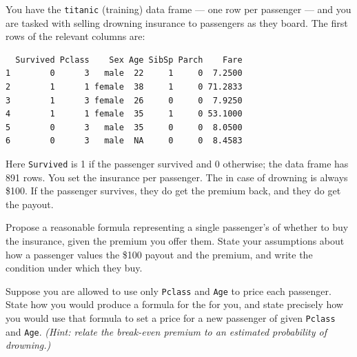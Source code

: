 \question{}

You have the \verb|titanic| (training) data frame --- one row per passenger --- and you are tasked with selling drowning insurance to passengers as they board. The first rows of the relevant columns are:

\begin{verbatim}
  Survived Pclass    Sex Age SibSp Parch    Fare
1        0      3   male  22     1     0  7.2500
2        1      1 female  38     1     0 71.2833
3        1      3 female  26     0     0  7.9250
4        1      1 female  35     1     0 53.1000
5        0      3   male  35     0     0  8.0500
6        0      3   male  NA     0     0  8.4583
\end{verbatim}

Here \verb|Survived| is 1 if the passenger survived and 0 otherwise; the data frame has 891 rows. You set the insurance  per passenger. The  in case of drowning is always \$100. If the passenger survives, they do  get the premium back, and they do  get the payout.

\subquestion[8]{}
Propose a reasonable formula representing a single passenger's  of whether to buy the insurance, given the premium you offer them. State your assumptions about how a passenger values the \$100 payout and the premium, and write the condition under which they buy.

\ifanswerspace
\vfillstretch
\fi

\subquestion[8]{}
Suppose you are allowed to use only \verb|Pclass| and \verb|Age| to price each passenger. State how you would produce a formula for the  for you, and state precisely how you would use that formula to set a price for a new passenger of given \verb|Pclass| and \verb|Age|. \emph{(Hint: relate the break-even premium to an estimated probability of drowning.)}

\ifanswerspace
\vfillstretch
\fi

